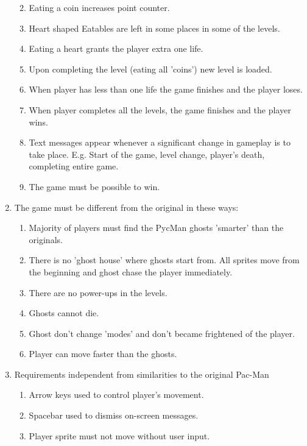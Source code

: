 \documentclass[11pt,a4paper]{report}
\begin{document}
\begin{enumerate}
\begin{enumerate}
						\label{req-coins-disappearing}
					\item
						Eating a coin increases point counter.
						\label{req-point++}
					\item
						Heart shaped Eatables are left in some places in some of the levels.
						\label{req-hearts}
					\item
						Eating a heart grants the player extra one life.
						\label{req-lifes++}
					\item
						Upon completing the level (eating all 'coins') new level is loaded.
						\label{req-level-up}
					\item
						When player has less than one life the game finishes and the player loses.
						\label{req-game-over}
					\item
						When player completes all the levels, the game finishes and the player wins.
						\label{req-win}
					\item
						Text messages appear whenever a significant change in gameplay is to take place.
						E.g. Start of the game, level change, player's death, completing entire game.
						\label{req-messages}
					\item
						The game must be possible to win.
						\label{req-winnable}
				\end{enumerate}
				\item
					The game must be different from the original in these ways:
					\begin{enumerate}
						\item
							Majority of players must find the PycMan ghosts 'smarter' than the originals.
							\label{req-smarter-ghosts}
						\item
							There is no 'ghost house' where ghosts start from. All sprites move from the beginning and ghost chase the player immediately.
						\item
							There are no power-ups in the levels.
						\item
							Ghosts cannot die.
						\item
							Ghost don't change 'modes' and don't became frightened of the player.
						\item
							Player can move faster than the ghosts.
							\label{req-player-faster}
					\end{enumerate}
				\item 
					Requirements independent from similarities to the original Pac-Man
					\begin{enumerate}
						\item
							Arrow keys used to control player's movement.
							\label{req-input}
						\item
							Spacebar used to dismiss on-screen messages.
						\item
							Player sprite must not move without user input.
						

\end{enumerate}
\end{enumerate}
\end{document}
